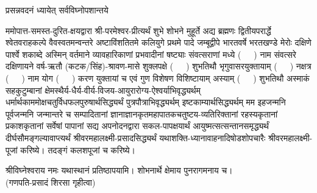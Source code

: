
\setlength{\parindent}{0pt}


 

{प्रसन्नवदनं ध्यायेत् सर्वविघ्नोपशान्तये}
 

ममोपात्त-समस्त-दुरित-क्षयद्वारा श्री-परमेश्वर-प्रीत्यर्थं शुभे शोभने मुहूर्ते अद्य ब्रह्मणः
द्वितीयपरार्द्धे श्वेतवराहकल्पे वैवस्वतमन्वन्तरे अष्टाविंशतितमे कलियुगे प्रथमे पादे
जम्बूद्वीपे भारतवर्षे भरतखण्डे मेरोः दक्षिणे पार्श्वे शकाब्दे अस्मिन् वर्तमाने व्यावहारिकाणां प्रभवादीनां षष्ट्याः संवत्सराणां मध्ये \mbox{(~~~)} नाम संवत्सरे दक्षिणायने 
वर्ष-ऋतौ (कटक/सिंह)-श्रावण-मासे शुक्लपक्षे \mbox{(~~~)} शुभतिथौ भृगुवासरयुक्तायाम्
\mbox{(~~~)} नक्षत्र \mbox{(~~~)} नाम  योग  \mbox{(~~~)} करण युक्तायां च एवं गुण विशेषण विशिष्टायाम्
अस्याम् \mbox{(~~~)} शुभतिथौ 
अस्माकं सहकुटुम्बानां क्षेमस्थैर्य-धैर्य-वीर्य-विजय-आयुरारोग्य-ऐश्वर्याभिवृद्ध्यर्थम्
 धर्मार्थकाममोक्ष\-चतुर्विधफलपुरुषार्थसिद्ध्यर्थं पुत्रपौत्राभि\-वृद्ध्यर्थम् इष्टकाम्यार्थसिद्ध्यर्थम्
मम इहजन्मनि पूर्वजन्मनि जन्मान्तरे च सम्पादितानां ज्ञानाज्ञानकृतमहा\-पातकचतुष्टय-व्यतिरिक्तानां रहस्यकृतानां प्रकाशकृतानां सर्वेषां पापानां सद्य अपनोदनद्वारा सकल-पापक्षयार्थं आयुष्मत्सत्सन्तानसमृद्ध्यर्थं दीर्घसौमङ्गल्यावाप्त्यर्थं
श्रीवरमहालक्ष्मी-प्रसादसिद्ध्यर्थं 
यथाशक्ति-ध्यानावाहनादिषोडशोपचारैः 
श्रीवरमहालक्ष्मी-पूजां करिष्ये। तदङ्गं कलशपूजां च करिष्ये। 


श्रीविघ्नेश्वराय नमः यथास्थानं प्रतिष्ठापयामि। शोभनार्थे क्षेमाय पुनरागमनाय च।\\
(गणपति-प्रसादं शिरसा गृहीत्वा)













